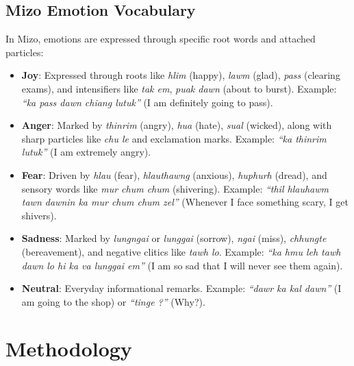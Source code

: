 \documentclass[conference]{IEEEtran}
\begin{document}
\subsection{Mizo Emotion Vocabulary}
In Mizo, emotions are expressed through specific root words and attached particles:
\begin{itemize}
    \item \textbf{Joy}: Expressed through roots like \textit{hlim} (happy), \textit{lawm} (glad), \textit{pass} (clearing exams), and intensifiers like \textit{tak em}, \textit{puak dawn} (about to burst). Example: \textit{``ka pass dawn chiang lutuk''} (I am definitely going to pass).
    \item \textbf{Anger}: Marked by \textit{thinrim} (angry), \textit{hua} (hate), \textit{sual} (wicked), along with sharp particles like \textit{chu le} and exclamation marks. Example: \textit{``ka thinrim lutuk''} (I am extremely angry).
    \item \textbf{Fear}: Driven by \textit{hlau} (fear), \textit{hlauthawng} (anxious), \textit{huphurh} (dread), and sensory words like \textit{mur chum chum} (shivering). Example: \textit{``thil hlauhawm tawn dawnin ka mur chum chum zel''} (Whenever I face something scary, I get shivers).
    \item \textbf{Sadness}: Marked by \textit{lungngai} or \textit{lunggai} (sorrow), \textit{ngai} (miss), \textit{chhungte} (bereavement), and negative clitics like \textit{tawh lo}. Example: \textit{``ka hmu leh tawh dawn lo hi ka va lunggai em''} (I am so sad that I will never see them again).
    \item \textbf{Neutral}: Everyday informational remarks. Example: \textit{``dawr ka kal dawn''} (I am going to the shop) or \textit{``tinge ?''} (Why?).
\end{itemize}

\section{Methodology}
\end{document}
